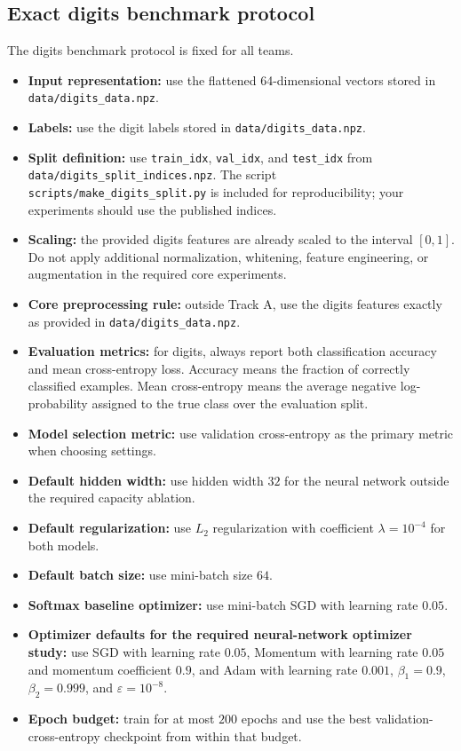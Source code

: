 \documentclass[11pt]{article}
\newcommand{\filepath}[1]{\nolinkurl{#1}}
\begin{document}
\subsection{Exact digits benchmark protocol}

The digits benchmark protocol is fixed for all teams.

\begin{itemize}
    \item \textbf{Input representation:} use the flattened 64-dimensional vectors stored in \filepath{data/digits_data.npz}.
    \item \textbf{Labels:} use the digit labels stored in \filepath{data/digits_data.npz}.
    \item \textbf{Split definition:} use \texttt{train\_idx}, \texttt{val\_idx}, and \texttt{test\_idx} from \filepath{data/digits_split_indices.npz}. The script \filepath{scripts/make_digits_split.py} is included for reproducibility; your experiments should use the published indices.
    \item \textbf{Scaling:} the provided digits features are already scaled to the interval \([0,1]\). Do not apply additional normalization, whitening, feature engineering, or augmentation in the required core experiments.
    \item \textbf{Core preprocessing rule:} outside Track A, use the digits features exactly as provided in \filepath{data/digits_data.npz}.
    \item \textbf{Evaluation metrics:} for digits, always report both classification accuracy and mean cross-entropy loss. Accuracy means the fraction of correctly classified examples. Mean cross-entropy means the average negative log-probability assigned to the true class over the evaluation split.
    \item \textbf{Model selection metric:} use validation cross-entropy as the primary metric when choosing settings.
    \item \textbf{Default hidden width:} use hidden width \(32\) for the neural network outside the required capacity ablation.
    \item \textbf{Default regularization:} use \(L_2\) regularization with coefficient \(\lambda = 10^{-4}\) for both models.
    \item \textbf{Default batch size:} use mini-batch size \(64\).
    \item \textbf{Softmax baseline optimizer:} use mini-batch SGD with learning rate \(0.05\).
    \item \textbf{Optimizer defaults for the required neural-network optimizer study:} use SGD with learning rate \(0.05\), Momentum with learning rate \(0.05\) and momentum coefficient \(0.9\), and Adam with learning rate \(0.001\), \(\beta_1=0.9\), \(\beta_2=0.999\), and \(\varepsilon = 10^{-8}\).
    \item \textbf{Epoch budget:} train for at most \(200\) epochs and use the best validation-cross-entropy checkpoint from within that budget.
\end{itemize}
\end{document}
